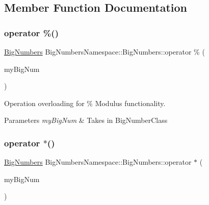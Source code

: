 \subsection{Member Function Documentation}
\mbox{\label{class_big_numbers_namespace_1_1_big_numbers_a568d0045db0873c7ac775b8e3c68505e}} 
\subsubsection{\texorpdfstring{operator \%()}{operator \%()}}
{\footnotesize\ttfamily \mbox{\hyperlink{class_big_numbers_namespace_1_1_big_numbers}{Big\+Numbers}} Big\+Numbers\+Namespace\+::\+Big\+Numbers\+::operator \% (\begin{DoxyParamCaption}\item[{const \mbox{\hyperlink{class_big_numbers_namespace_1_1_big_numbers}{Big\+Numbers}} \&}]{my\+Big\+Num }\end{DoxyParamCaption})\hspace{0.3cm}{\ttfamily [private]}}



Operation overloading for \% Modulus functionality. 


\begin{DoxyParams}{Parameters}
{\em my\+Big\+Num} & Takes in Big\+Number\+Class \\
\hline
\end{DoxyParams}
\mbox{\label{class_big_numbers_namespace_1_1_big_numbers_a71a05e5a8eb4032a056d93f5006a6d73}} 
\subsubsection{\texorpdfstring{operator $\ast$()}{operator *()}}
{\footnotesize\ttfamily \mbox{\hyperlink{class_big_numbers_namespace_1_1_big_numbers}{Big\+Numbers}} Big\+Numbers\+Namespace\+::\+Big\+Numbers\+::operator $\ast$ (\begin{DoxyParamCaption}\item[{const \mbox{\hyperlink{class_big_numbers_namespace_1_1_big_numbers}{Big\+Numbers}} \&}]{my\+Big\+Num }\end{DoxyParamCaption})\hspace{0.3cm}{\ttfamily [private]}}



